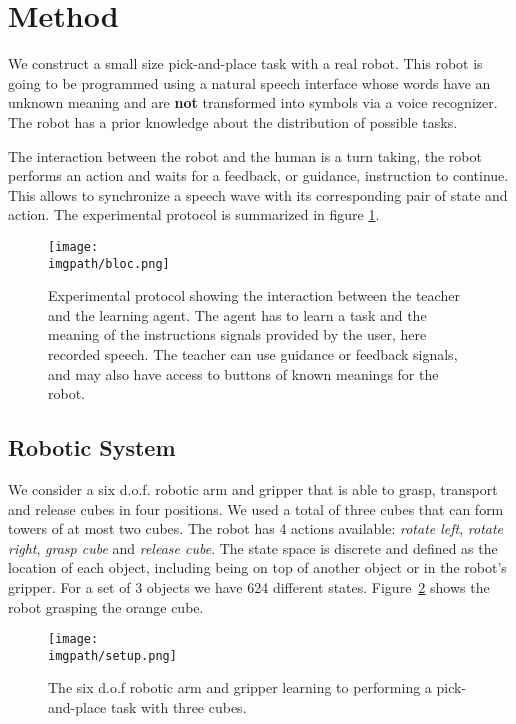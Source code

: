 \section{Method}

We construct a small size pick-and-place task with a real robot. This robot is going to be programmed using a natural speech interface whose words have an unknown meaning and are \textbf{not} transformed into symbols via a voice recognizer. The robot has a prior knowledge about the distribution of possible tasks.

The interaction between the robot and the human is a turn taking, the robot performs an action and waits for a feedback, or guidance, instruction to continue. This allows to synchronize a speech wave with its corresponding pair of state and action. The experimental protocol is summarized in figure \ref{fig:lfui:bloc}.

\begin{figure}[!htbp]
  \centering
  \texttt{[image: \\imgpath/bloc.png]}
  \caption{Experimental protocol showing the interaction between the teacher and the learning agent. The agent has to learn a task and the meaning of the instructions signals provided by the user, here recorded speech. The teacher can use guidance or feedback signals, and may also have access to buttons of known meanings for the robot.}
  \label{fig:lfui:bloc}    
\end{figure}

\subsection{Robotic System}

We consider a six d.o.f. robotic arm and gripper that is able to grasp, transport and release cubes in four positions. We used a total of three cubes that can form towers of at most two cubes.  The robot has 4 actions available: \textit{rotate left}, \textit{rotate right}, \textit{grasp cube} and \textit{release cube}. The state space is discrete and defined as the location of each object, including being on top of another object or in the robot's gripper. For a set of 3 objects we have 624 different states. Figure~\ref{fig:lfui:setup} shows the robot grasping the orange cube. 

\begin{figure}[!htbp]
  \centering
  \texttt{[image: \\imgpath/setup.png]}
  \caption{The six d.o.f robotic arm and gripper learning to performing a pick-and-place task with three cubes.}
  \label{fig:lfui:setup}
\end{figure}


